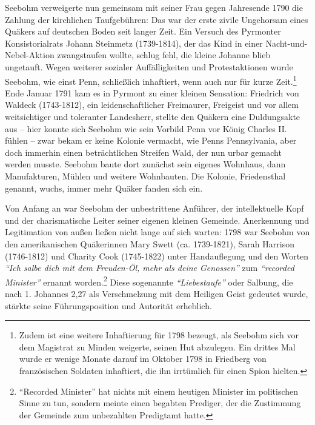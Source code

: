 \medskip

Seebohm verweigerte nun gemeinsam mit seiner Frau gegen Jahresende 1790 die
Zahlung der kirchlichen Taufgebühren: Das war der erste
zivile Ungehorsam eines Quäkers auf deutschen Boden
seit langer Zeit. Ein Versuch des Pyrmonter Konsistorialrats Johann
Steinmetz (1739-1814), der das Kind in einer
Nacht-und-Nebel-Aktion zwangstaufen wollte, schlug fehl, die kleine
Johanne blieb ungetauft. Wegen weiterer
sozialer Auffälligkeiten und Protestaktionen wurde
Seebohm, wie einst Penn, schließlich
inhaftiert, wenn auch nur für kurze
Zeit.\footnote{Zudem ist eine weitere Inhaftierung für 1798 bezeugt, als Seebohm
sich vor
dem Magistrat zu Minden weigerte, seinen Hut abzulegen. Ein drittes Mal wurde er
wenige Monate darauf im Oktober 1798 in Friedberg von französischen Soldaten
inhaftiert, die ihn irrtümlich für einen Spion hielten.} Ende Januar 1791 kam es
in Pyrmont zu einer kleinen Sensation: Friedrich von
Waldeck (1743-1812), ein
leidenschaftlicher Freimaurer, Freigeist und vor
allem weitsichtiger und toleranter Landesherr, stellte den Quäkern eine
Duldungsakte aus -- hier konnte sich Seebohm wie sein
Vorbild Penn vor König Charles II. fühlen --
zwar bekam er keine Kolonie vermacht, wie Penns Pennsylvania, aber doch
immerhin einen beträchtlichen Streifen Wald, der nun urbar gemacht werden
musste. Seebohm baute dort zunächst sein eigenes Wohnhaus, dann Manufakturen,
Mühlen und weitere Wohnbauten. Die Kolonie,
Friedensthal genannt, wuchs, immer mehr Quäker fanden
sich ein.

\medskip

Von Anfang an war Seebohm der unbestrittene Anführer, der intellektuelle Kopf
und der charismatische Leiter seiner eigenen kleinen Gemeinde. Anerkennung und
Legitimation von außen ließen nicht lange auf sich warten: 1798 war Seebohm von
den amerikanischen Quäkerinnen Mary Swett (ca.
1739-1821), Sarah Harrison (1746-1812) und Charity Cook (1745-1822) unter Handauflegung und den Worten \textit{"`Ich salbe dich mit dem
Freuden-Öl, mehr als deine Genossen"'} zum \textit{"`recorded Minister"'} ernannt worden.\footnote{"`Recorded Minister"' hat nichts mit einem
heutigen Minister im politischen
Sinne zu tun, sondern meinte einen begabten Prediger, der die Zustimmung der
Gemeinde zum unbezahlten Predigtamt hatte.} Diese sogenannte
\textit{"`Liebestaufe"'} oder Salbung, die nach
1. Johannes 2,27 als Verschmelzung mit dem Heiligen Geist
gedeutet wurde, stärkte seine Führungsposition und Autorität erheblich.

